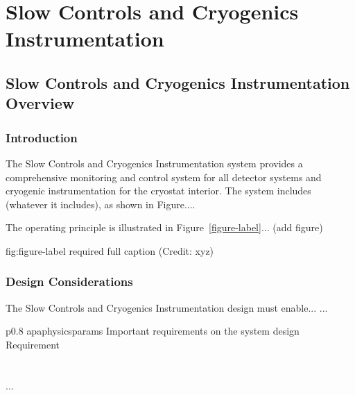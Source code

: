 \chapter{Slow Controls and Cryogenics Instrumentation}
\label{ch:fdsp-slow-cryo}

\section{Slow Controls and Cryogenics Instrumentation Overview}
\label{sec:fdsp-slow-cryo-ov}


\subsection{Introduction}
\label{sec:fdsp-slow-cryo-intro}

The Slow Controls and Cryogenics Instrumentation system provides a
comprehensive monitoring and control system for all detector systems
and cryogenic instrumentation for the cryostat interior.
The system includes (whatever it includes), as shown in Figure.... 


The operating principle is illustrated in Figure~\ref{figure-label}... (add figure)

\begin{dunefigure}{fig:figure-label}
{required full caption (Credit: xyz)}
\end{dunefigure}

\subsection{Design Considerations}
\label{sec:fdsp-slow-cryo-des-consid}


The Slow Controls and Cryogenics Instrumentation design must enable... 
...


\begin{dunetable}
{p{0.8\textwidth}}
{apaphysicsparams}
{Important requirements on the system design}   
Requirement  \\ \toprowrule
  \\ \colhline
   \\ \colhline
 ...\\ 
\end{dunetable}

